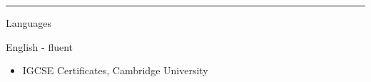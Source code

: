 \documentclass[a4paper,10pt]{article}
\newlength{\cvcolumngapwidth}
\newlength{\cvleftcolumnwidth}
\newlength{\cvrightcolumnwidth}
\newcommand{\cvsectionstyle}[1]{{\normalsize\cvsectionfont\textcolor{cvsectioncolor}{#1}}}
\newcommand{\cvtitlestyle}[1]{{\large\cvtitlefont\textcolor{cvtitlecolor}{#1}}}
\newcommand{\cvdurationstyle}[1]{{\small\cvdurationfont\textcolor{cvdurationcolor}{#1}}}
\newcommand{\cvheadingstyle}[1]{{\normalsize\cvheadingfont\textcolor{cvheadingcolor}{#1}}}
\newlength{\cvafteritemskipamount}
\newlength{\cvaftersectionskipamount}
\newlength{\cvbetweensectionandheadingextraskipamount}
\newlength{\cvaftertitleskipamount}
\newlength{\cvparskip}
\newcommand{\cvsection}[1]{
    \begin{minipage}[t]{\cvleftcolumnwidth}
        \raggedleft\cvsectionstyle{#1}
    \end{minipage}%
    \hspace{\cvcolumngapwidth}%
    \begin{minipage}[t]{\cvrightcolumnwidth}
        \textcolor{cvrulecolor}{\rule{\cvrightcolumnwidth}{0.3mm}}
    \end{minipage}

    \vspace{\cvaftersectionskipamount}
}
\newcommand{\cvitem}[2]{
    \begin{minipage}[t]{\cvleftcolumnwidth}
        \raggedleft #1
    \end{minipage}%
    \hspace{\cvcolumngapwidth}%
    \begin{minipage}[t]{\cvrightcolumnwidth}
        \setlength{\parskip}{\cvparskip} #2
    \end{minipage}

    \vspace{\cvafteritemskipamount}
}
\newcommand{\cvtitle}[1]{
    \cvtitlestyle{#1}

    \vspace{\cvaftertitleskipamount}
    \vspace{-\cvparskip}
}
\begin{document}



\cvsection{SKILLS}

\vspace{\cvbetweensectionandheadingextraskipamount}

\cvitem{
    \cvheadingstyle{Languages}
}{
    English - fluent 
    \begin{itemize}
        \item IGCSE Certificates, Cambridge University 
    \end{itemize}

}

%     

%     
%     
%     










%
\end{document}
